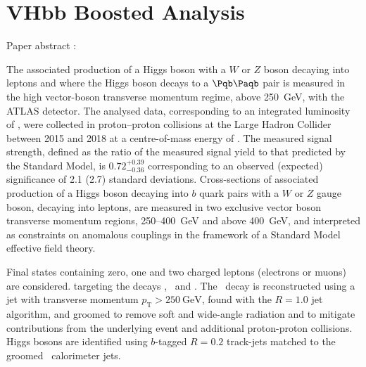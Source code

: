 \chapter{VHbb Boosted Analysis}\label{chap:vhbb_boosted}

Paper abstract :

The associated production of a Higgs boson with a $W$ or $Z$ boson
decaying into leptons and where the Higgs boson decays to a $\bbbar$
pair is measured in the high vector-boson transverse momentum regime,
above \SI{250}{\GeV}, with the ATLAS detector. The analysed data,
corresponding to an integrated luminosity of \intlumi, were collected
in proton--proton collisions at the Large Hadron Collider between
2015 and 2018 at a centre-of-mass energy of \sqsthirt. The measured
signal strength, defined as the ratio of the measured signal yield to
that predicted by the Standard Model, is $0.72 ^{+0.39}_{-0.36}$
corresponding to an observed (expected) significance of 2.1 (2.7)
standard deviations. Cross-sections of associated production of a
Higgs boson decaying into $b$ quark pairs with a $W$ or $Z$ gauge
boson, decaying into leptons, are measured in two exclusive
vector boson transverse momentum regions, 250--\SI{400}{\GeV} and above \SI{400}{\GeV}, and
interpreted as constraints on anomalous couplings in the framework of
a Standard Model effective field theory.

Final states containing zero, one and two charged
leptons (electrons or muons) are considered. targeting the
decays \Znn, \Wln\ and \Zll. The \hbb\ decay is reconstructed using a
jet with transverse momentum $p_{\mathrm{T}} > \SI{250}{\GeV}$, found with
the \antikt $R = 1.0$ jet algorithm, and groomed to remove soft
and wide-angle radiation and to mitigate contributions from the
underlying event and additional proton-proton collisions. Higgs
bosons are identified using $b$-tagged $R = 0.2$ track-jets matched
to the groomed \largeR\ calorimeter jets. 




